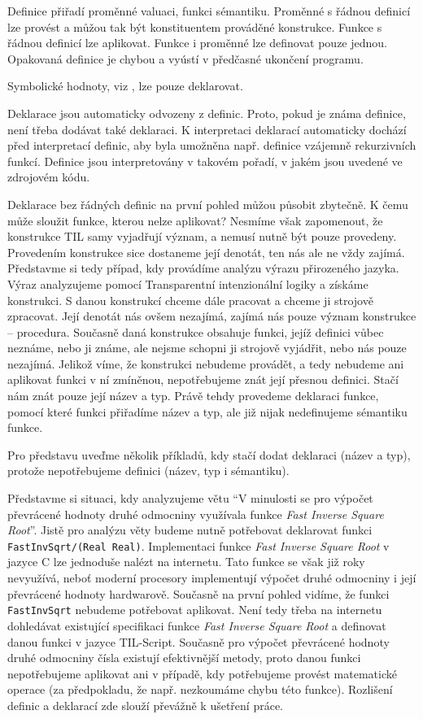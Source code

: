 Definice přiřadí proměnné valuaci, funkci sémantiku. Proměnné s řádnou definicí lze provést
a můžou tak být konstituentem prováděné konstrukce. Funkce s řádnou definicí lze aplikovat. Funkce
i proměnné lze definovat pouze jednou. Opakovaná definice je chybou a vyústí v předčasné ukončení
programu.

Symbolické hodnoty, viz , lze pouze deklarovat.

Deklarace jsou automaticky odvozeny z definic. Proto, pokud je známa definice, není třeba dodávat
také deklaraci. K interpretaci deklarací automaticky dochází před interpretací definic, aby byla
umožněna např. definice vzájemně rekurzivních funkcí. Definice jsou interpretovány v takovém
pořadí, v jakém jsou uvedené ve zdrojovém kódu.

Deklarace bez řádných definic na první pohled můžou působit zbytečně. K čemu může sloužit funkce,
kterou nelze aplikovat? Nesmíme však zapomenout, že konstrukce TIL samy vyjadřují význam, a nemusí
nutně být pouze provedeny. Provedením konstrukce sice dostaneme její denotát, ten nás ale ne
vždy zajímá. Představme si tedy případ, kdy provádíme analýzu výrazu přirozeného jazyka. Výraz
analyzujeme pomocí Transparentní intenzionální logiky a získáme konstrukci. S danou konstrukcí
chceme dále pracovat a chceme ji strojově zpracovat. Její denotát nás ovšem nezajímá, zajímá nás
pouze význam konstrukce -- procedura. Současně daná konstrukce obsahuje funkci, jejíž definici vůbec
neznáme, nebo ji známe, ale nejsme schopni ji strojově vyjádřit, nebo nás pouze nezajímá. Jelikož
víme, že konstrukci nebudeme provádět, a tedy nebudeme ani aplikovat funkci v ní zmíněnou,
nepotřebujeme znát její přesnou definici. Stačí nám znát pouze její název a typ. Právě tehdy
provedeme deklaraci funkce, pomocí které funkci přiřadíme název a typ, ale již nijak nedefinujeme
sémantiku funkce.

Pro představu uveďme několik příkladů, kdy stačí dodat deklaraci (název a typ), protože
nepotřebujeme definici (název, typ i sémantiku).

Představme si situaci, kdy analyzujeme větu ``V minulosti se pro výpočet převrácené hodnoty druhé
odmocniny využívala funkce \textit{Fast Inverse Square Root}''. Jistě pro analýzu věty budeme
nutně potřebovat deklarovat funkci \lstinline{FastInvSqrt/(Real Real)}. Implementaci funkce
\textit{Fast Inverse Square Root} v jazyce C lze jednoduše nalézt na internetu. Tato funkce se však
již roky nevyužívá, neboť moderní procesory implementují výpočet druhé odmocniny i její převrácené
hodnoty hardwarově. Současně na první pohled vidíme, že funkci \lstinline{FastInvSqrt} nebudeme
potřebovat aplikovat. Není tedy třeba na internetu dohledávat existující specifikaci funkce
\textit{Fast Inverse Square Root} a definovat danou funkci v jazyce TIL-Script. Současně pro výpočet
převrácené hodnoty druhé odmocniny čísla existují efektivnější metody, proto danou funkci
nepotřebujeme aplikovat ani v případě, kdy potřebujeme provést matematické operace (za předpokladu,
že např. nezkoumáme chybu této funkce). Rozlišení definic a deklarací zde slouží převážně k ušetření
práce.

